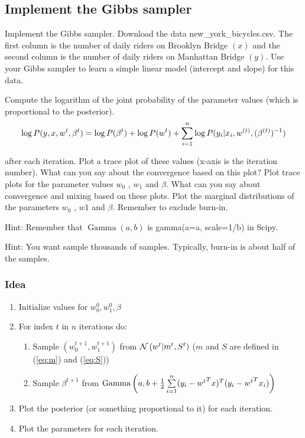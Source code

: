 \documentclass[12pt]{article}
\begin{document}
    \subsection{Implement the Gibbs sampler} \label{sec:fuck}
        \begin{tcolorbox}[breakable]
            Implement the Gibbs sampler. Download the data new\_york\_bicycles.csv. The first column is the number of daily riders on Brooklyn Bridge $(x)$ and the second column is the number of daily riders on Manhattan Bridge $(y)$. Use your Gibbs sampler to learn a simple linear model (intercept and slope) for this data. 
            
            \vspace{3mm}
            Compute the logarithm of the joint probability of the parameter values (which is proportional to the posterior).
            \begin{align*}
                \log P(y,x,w^{t},\beta^{t}) = \log P(\beta^{t}) + \log P(w^{t}) + \sum\limits_{i=1}^{n} \log P(y_i|x_i,w^{(t)},(\beta^{(t)})^{-1})
            \end{align*}

            after each iteration. Plot a trace plot of these values (x-axis is the iteration number). What can you say about the convergence based on this plot? Plot trace plots for the parameter values $w_0$ , $w_1$ and $\beta$. What can you say about convergence and mixing based on these plots. Plot the marginal distributions of the parameters $w_0$ , $w 1$ and $\beta$. Remember to exclude burn-in. 

            \vspace{3mm}
            Hint: Remember that $\operatorname{Gamma}(a,b)$ is gamma(a=a, scale=1/b) in Scipy. 
            
            Hint: You want sample thousands of samples. Typically, burn-in is about half of the samples.
        \end{tcolorbox}
        \pagebreak
        \subsubsection*{Idea}
            \begin{enumerate}
                \item Initialize values for $w_0^0, w_1^0, \beta$
                \item For index $t$ in $n$ iterations do:
                \begin{enumerate}[label*={\arabic*.}]
                    \item Sample $(w_0^{t+1}, w_1^{t+1})$ from $\mathcal{N} \left(w^t|m^t, S^t\right)$ ($m$ and $S$ are defined in (\ref{eq:m}) and (\ref{eq:S}))
                    \item Sample $\beta^{t+1}$ from $\operatorname{Gamma} \left(a, b+\frac{1}{2} \sum\limits_{i=1}^{n} (y_i-{w^t}^Tx)^T (y_i-{w^t}^Tx_i)\right)$
                \end{enumerate}
                \item Plot the posterior (or something proportional to it) for each iteration.
                \item Plot the parameters for each iteration. 
            \end{enumerate}
        
\end{document}
